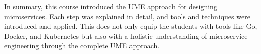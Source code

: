 In summary, this course introduced the UME approach for designing microservices.
Each step was explained in detail, and tools and techniques were introduced and applied.
This does not only equip the students with tools like Go, Docker, and Kubernetes but also with a holistic understanding of microservice engineering through the complete UME approach.
